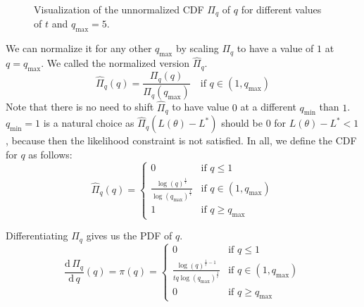 \documentclass[12pt, a4paper]{report}
\begin{document}
\begin{figure}
    \centering
    \caption{Visualization of the unnormalized CDF $\Pi_q$ of $q$ for different values of $t$ and $q_{\textrm{max}}=5$.}
    \label{fig:unnormalized}
\end{figure}

We can normalize it for any other $q_{\textrm{max}}$ by scaling $\Pi_q$ to have a value of $1$ at $q=q_{\textrm{max}}$.
We called the normalized version $\hat{\Pi}_q$.
$$
\hat{\Pi}_q(q) = \frac{\Pi_q(q)}{\Pi_q(q_{\textrm{max}})} \quad \textrm{if } q \in (1, q_{\textrm{max}})
$$
Note that there is no need to shift $\hat{\Pi}_q$ to have value $0$ at a different $q_{\textrm{min}}$ than $1$.
$q_{\textrm{min}}=1$ is a natural choice as $\hat{\Pi}_q(L(\theta) - L^*)$ should be $0$ for $L(\theta) - L^* < 1$, because then the likelihood constraint is not satisfied.
In all, we define the CDF for $q$ as follows:
$$
\hat{\Pi}_q(q) = 
\begin{cases}
    0 & \text{if } q \leq 1 \\
    \frac{\log(q)^\frac{1}{t}}{\log(q_{\textrm{max}})^\frac{1}{t}} & \text{if } q \in (1, q_{\textrm{max}})\\
    1 & \text{if } q \geq q_{\textrm{max}}
\end{cases}
$$

Differentiating $\hat{\Pi}_q$ gives us the PDF of $q$.
$$
    \frac{\textrm{d} \, \Pi_q}{\textrm{d} \, q} (q) = \pi(q) = 
    \begin{cases}
        0 & \text{if } q \leq 1 \\
        \frac{\log(q)^{\frac{1}{t}-1}}{tq\log(q_{\textrm{max}})^\frac{1}{t}} & \text{if } q \in (1, q_{\textrm{max}})\\
        0 & \text{if } q \geq q_{\textrm{max}}
    \end{cases}
$$
\end{document}
